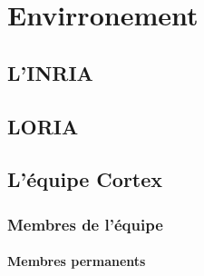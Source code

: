 \chapter{Envirronement} %
\label{cha:Envirronement}

\section{L'INRIA} %
\label{sec:L'INRIA}


\section{LORIA} %
\label{sec:LORIA}


\section{L'équipe Cortex} %
\label{sec:Cortex}

\subsection{Membres de l'équipe} %
\label{sub:Membres de l'équipe}

\subsubsection{Membres permanents} %
\label{ssub:Membres permanents}

